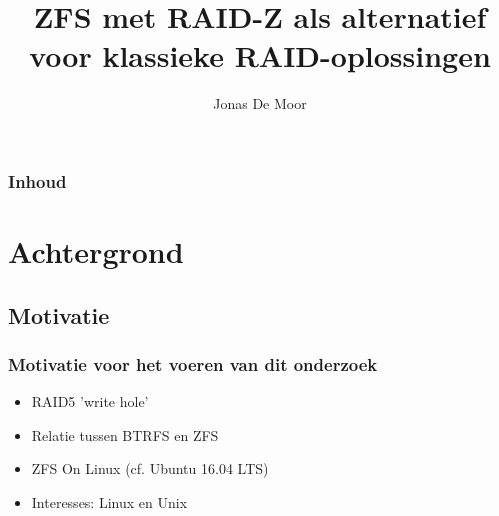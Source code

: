 \documentclass{beamer}
\date{\displaydate{date}}
\title[Presentatie Bachelorproef]{ZFS met RAID-Z als alternatief voor klassieke RAID-oplossingen} %
\author{Jonas De Moor} %
\institute[HoGent] %
{
Toegepaste Informatica - Systeem- en Netwerkbeheer \\ Hogeschool Gent \\ %
\medskip
\textit{jonas.demoor.v3741@student.hogent.be} %
}
\date{\displaydate{date}} %
\begin{document}
\begin{frame}
\titlepage %
\end{frame}

\begin{frame}
\frametitle{Inhoud} %
\tableofcontents %
\end{frame}


\section{Achtergrond} %

\subsection{Motivatie} %


\begin{frame}
\frametitle{Motivatie voor het voeren van dit onderzoek}

  \begin{itemize}
    \item{RAID5 'write hole'}
    \item Relatie tussen BTRFS en ZFS
    \item ZFS On Linux (cf. Ubuntu 16.04 LTS)
    \item Interesses: Linux en Unix
  \end{itemize}

\end{frame}
\end{document}
